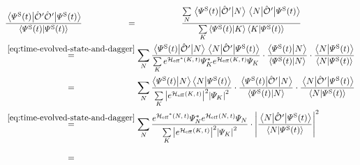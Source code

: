\begin{equation}
    \label{eq:expectation-value-square-operator}
    \begin{split}
        &\frac{\bracketHelper{\psiOfT[\schroedingerPicture]}{{\ObservableOp{}'}{\ObservableOp{}'}}{\psiOfT[\schroedingerPicture]}}{\braketHelper{\psiOfT[\schroedingerPicture]}{\psiOfT[\schroedingerPicture]}}
        \stackrel{\phantom{\ref{eq:time-evolution-target}}}{=} 
        \frac{
            \lsum[N] \bracketHelper{\psiOfT[\schroedingerPicture]}{{\ObservableOp{}'}}{N} \bracketHelper{N}{{\ObservableOp{}'}}{\psiOfT[\schroedingerPicture]}
        }{
            \lsum[K] \braketHelper{\psiOfT[\schroedingerPicture]}{K} \braketHelper{K}{\psiOfT[\schroedingerPicture]}
        }\\
        & \stackrel{\ref{eq:time-evolved-state-and-dagger}}{=} 
        \lsum[N]
        \frac{
            \bracketHelper{\psiOfT[\schroedingerPicture]}{{\ObservableOp{}'}}{N} \bracketHelper{N}{{\ObservableOp{}'}}{\psiOfT[\schroedingerPicture]}
        }{
            \lsum[K] e^{\HeffOftStar[K]} \psiNStar[K] e^{\HeffOft[K]} \psiN[K] 
        }
        \cdot
        \frac{\braketHelper{\psiOfT[\schroedingerPicture]}{N}}{\braketHelper{\psiOfT[\schroedingerPicture]}{N}}
        \cdot 
        \frac{\braketHelper{N}{\psiOfT[\schroedingerPicture]}}{\braketHelper{N}{\psiOfT[\schroedingerPicture]}}
        \\
        & \stackrel{\phantom{\ref{eq:time-evolved-state-and-dagger}}}{=} 
        \lsum[N]
        \frac{
            \braketHelper{\psiOfT[\schroedingerPicture]}{N} \braketHelper{N}{\psiOfT[\schroedingerPicture]}
        }{
            \lsum[K] \absSquare{e^{\HeffOft[K]}} \absSquare{\psiN[K]} 
        } \cdot 
        \frac{\bracketHelper{\psiOfT[\schroedingerPicture]}{{\ObservableOp{}'}}{N}}{\braketHelper{\psiOfT[\schroedingerPicture]}{N}}
        \cdot 
        \frac{\bracketHelper{N}{{\ObservableOp{}'}}{\psiOfT[\schroedingerPicture]}}{\braketHelper{N}{\psiOfT[\schroedingerPicture]}}
        \\
        & \stackrel{\ref{eq:time-evolved-state-and-dagger}}{=} 
        \lsum[N]
        \frac{
            e^{\HeffOftStar} \psiNStar e^{\HeffOft} \psiN{}
        }{
            \lsum[K] \absSquare{e^{\HeffOft[K]}} \absSquare{\psiN[K]} 
        }  \cdot 
        \absSquare{\frac{\bracketHelper{N}{{\ObservableOp{}'}}{\psiOfT[\schroedingerPicture]}}{\braketHelper{N}{\psiOfT[\schroedingerPicture]}}}
        \\& \stackrel{\phantom{\ref{eq:time-evolved-state-and-dagger}}}{=} 

\end{split}
\end{equation}
